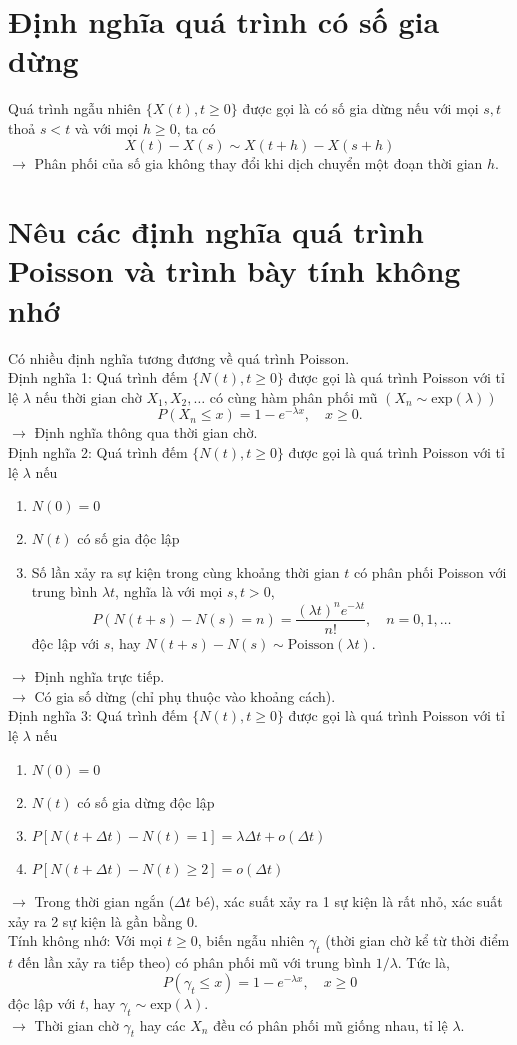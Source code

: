 \documentclass{article}
\begin{document}
\section{Định nghĩa quá trình có số gia dừng}
Quá trình ngẫu nhiên $\{X(t), t \geq 0\}$ được gọi là có số gia dừng nếu với mọi $s, t$ thoả $s < t$ và với mọi $h \geq 0$, ta có
\[
X(t) - X(s) \sim X(t + h) - X(s + h)
\]
$\rightarrow$ Phân phối của số gia không thay đổi khi dịch chuyển một đoạn thời gian $h$.

\section{Nêu các định nghĩa quá trình Poisson và trình bày tính không nhớ}
Có nhiều định nghĩa tương đương về quá trình Poisson.\\
Định nghĩa 1: Quá trình đếm $\{N(t), t \geq 0\}$ được gọi là quá trình Poisson với tỉ lệ $\lambda$ nếu thời gian chờ $X_1, X_2, \ldots$ có cùng hàm phân phối mũ $(X_n \sim \text{exp}(\lambda))$
\[
P(X_n \leq x) = 1 - e^{-\lambda x}, \quad x \geq 0.
\]
$\rightarrow$ Định nghĩa thông qua thời gian chờ.\\
Định nghĩa 2: Quá trình đếm $\{N(t), t \geq 0\}$ được gọi là quá trình Poisson với tỉ lệ $\lambda$ nếu
\begin{enumerate}
    \item $N(0) = 0$
    \item $N(t)$ có số gia độc lập
    \item Số lần xảy ra sự kiện trong cùng khoảng thời gian $t$ có phân phối Poisson với trung bình $\lambda t$, nghĩa là với mọi $s, t > 0$,
    \[
    P(N(t + s) - N(s) = n) = \frac{(\lambda t)^n e^{-\lambda t}}{n!}, \quad n = 0, 1, \ldots
    \]
    độc lập với $s$, hay $N(t + s) - N(s) \sim \text{Poisson}(\lambda t)$.
\end{enumerate}
$\rightarrow$ Định nghĩa trực tiếp.\\
$\rightarrow$ Có gia số dừng (chỉ phụ thuộc vào khoảng cách).\\
Định nghĩa 3: Quá trình đếm $\{N(t), t \geq 0\}$ được gọi là quá trình Poisson với tỉ lệ $\lambda$ nếu
\begin{enumerate}
    \item $N(0) = 0$
    \item $N(t)$ có số gia dừng độc lập
    \item $P[N(t + \Delta t) - N(t) = 1] = \lambda \Delta t + o(\Delta t)$
    \item $P[N(t + \Delta t) - N(t) \geq 2] = o(\Delta t)$
\end{enumerate}
$\rightarrow$ Trong thời gian ngắn ($\Delta t$ bé), xác suất xảy ra 1 sự kiện là rất nhỏ, xác suất xảy ra 2 sự kiện là gần bằng 0.\\
Tính không nhớ: Với mọi $t \geq 0$, biến ngẫu nhiên $\gamma_t$ (thời gian chờ kể từ thời điểm $t$ đến lần xảy ra tiếp theo) có phân phối mũ với trung bình $1/\lambda$. Tức là,
\[
P(\gamma_t \leq x) = 1 - e^{-\lambda x}, \quad x \geq 0
\]
độc lập với $t$, hay $\gamma_t \sim \text{exp}(\lambda)$.\\
$\rightarrow$ Thời gian chờ $\gamma_t$ hay các $X_n$ đều có phân phối mũ giống nhau, tỉ lệ $\lambda$.
\end{document}
